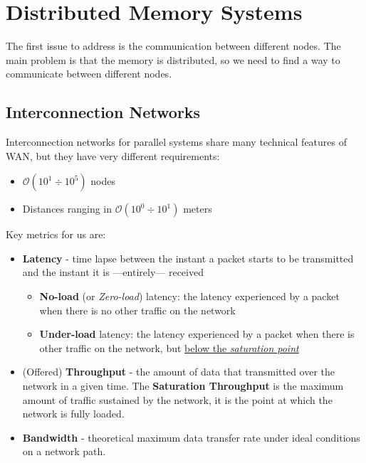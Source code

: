 \chapter{Distributed Memory Systems}

The first issue to address is the communication between different nodes. The main problem is that the memory is distributed, so we need to find a way to communicate between different nodes.

\section{Interconnection Networks}
Interconnection networks for parallel systems share many technical features of WAN, but they have very different requirements:
\begin{itemize}
   \item $\mathcal{O}(10^1 \div 10^5)$ nodes
   \item Distances ranging in $\mathcal{O}(10^0 \div 10^1)$ meters
\end{itemize}

Key metrics for us are:
\begin{itemize}
   \item \textbf{Latency} - time lapse between the instant a packet starts to be transmitted and the instant it is ---entirely--- received
   \begin{itemize}
      \item \textbf{No-load} (or \textit{Zero-load}) latency: the latency experienced by a packet when there is no other traffic on the network
      \item \textbf{Under-load} latency: the latency experienced by a packet when there is other traffic on the network, but \ul{below the \textit{saturation point}}
   \end{itemize}
   \item (Offered) \textbf{Throughput} - the amount of data that transmitted over the network in a given time.
   The \textbf{Saturation Throughput} is the maximum amount of traffic sustained by the network, it is the point at which the network is fully loaded. 
   \item \textbf{Bandwidth} - theoretical maximum data transfer rate under ideal conditions on a network path.
\end{itemize}


